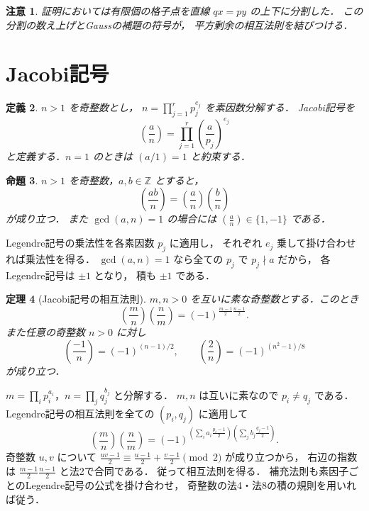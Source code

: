 \documentclass[a5paper,10pt,onecolumn]{jsarticle}
\makeatletter
\theoremstyle{mathnotetheorem}
\newtheorem{theorem}{定理}[section]
\newtheorem{definition}[theorem]{定義}
\newtheorem{proposition}[theorem]{命題}
\newtheorem{remark}[theorem]{注意}
\renewcommand{\proofname}{証明}
\renewenvironment{proof}[1][\proofname]{%
  \par\pushQED{\qed}\normalfont\topsep4\p@\@plus2\p@\relax
  \trivlist\item[\hskip\labelsep\bfseries #1]\ignorespaces
}{\popQED\endtrivlist\@endpefalse}
\makeatother
\begin{document}
\begin{remark}
証明においては有限個の格子点を直線
$q x=p y$ の上下に分割した．
この分割の数え上げとGaussの補題の符号が，
平方剰余の相互法則を結びつける．
\end{remark}

\section{Jacobi記号}

\begin{definition}
$n>1$ を奇整数とし，
$n=\prod_{j=1}^rp_j^{e_j}$ を素因数分解する．
Jacobi記号を
\[
 \left(\frac an\right)
 =\prod_{j=1}^r\left(\frac a{p_j}\right)^{e_j}
\]
と定義する．$n=1$ のときは $(a/1)=1$ と約束する．
\end{definition}

\begin{proposition}\label{prop:jacobi}
$n>1$ を奇整数，$a,b\in\mathbb Z$ とすると，
\[
 \left(\frac{ab}{n}\right)
 =\left(\frac an\right)\left(\frac bn\right)
\]
が成り立つ．
また $\gcd(a,n)=1$ の場合には
$\left(\frac an\right)\in\{1,-1\}$ である．
\end{proposition}
\begin{proof}
Legendre記号の乗法性を各素因数 $p_j$ に適用し，
それぞれ $e_j$ 乗して掛け合わせれば乗法性を得る．
$\gcd(a,n)=1$ なら全ての $p_j$ で $p_j\nmid a$ だから，
各Legendre記号は $\pm1$ となり，
積も $\pm1$ である．
\end{proof}

\begin{theorem}[Jacobi記号の相互法則]\label{thm:jacobi-recip}
$m,n>0$ を互いに素な奇整数とする．このとき
\[
 \left(\frac mn\right)\left(\frac nm\right)
 =(-1)^{\frac{m-1}{2}\frac{n-1}{2}}.
\]
また任意の奇整数 $n>0$ に対し
\[
 \left(\frac{-1}{n}\right)=(-1)^{(n-1)/2},
 \qquad
 \left(\frac2n\right)=(-1)^{(n^2-1)/8}
\]
が成り立つ．
\end{theorem}
\begin{proof}
$m=\prod_ip_i^{a_i}$，$n=\prod_jq_j^{b_j}$ と分解する．
$m,n$ は互いに素なので $p_i\ne q_j$ である．
Legendre記号の相互法則を全ての $(p_i,q_j)$ に適用して
\[
 \left(\frac mn\right)\left(\frac nm\right)
 =(-1)^{
  \left(\sum_i a_i\frac{p_i-1}{2}\right)
  \left(\sum_j b_j\frac{q_j-1}{2}\right)
 }.
\]
奇整数 $u,v$ について
$\frac{uv-1}{2}\equiv\frac{u-1}{2}+\frac{v-1}{2}\pmod2$
が成り立つから，
右辺の指数は
$\frac{m-1}{2}\frac{n-1}{2}$ と法2で合同である．
従って相互法則を得る．
補充法則も素因子ごとのLegendre記号の公式を掛け合わせ，
奇整数の法4・法8の積の規則を用いれば従う．
\end{proof}
\end{document}
